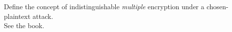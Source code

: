 \documentclass[12pt]{article}
\begin{document}
Define the concept of indistinguishable \emph{multiple} encryption under a chosen-plaintext attack.\\
See the book.
\end{document}
